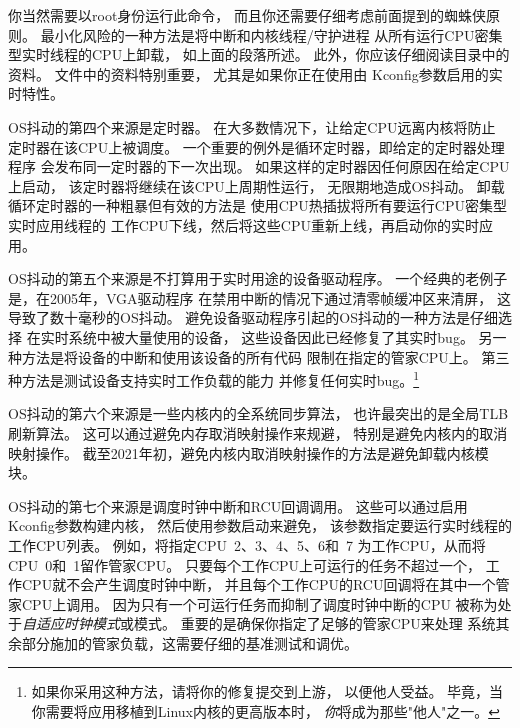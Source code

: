
你当然需要以root身份运行此命令，
而且你还需要仔细考虑前面提到的蜘蛛侠原则。
最小化风险的一种方法是将中断和内核线程/守护进程
从所有运行CPU密集型实时线程的CPU上卸载，
如上面的段落所述。
此外，你应该仔细阅读目录中的资料。
文件中的资料特别重要，
尤其是如果你正在使用由
Kconfig参数启用的实时特性。

OS抖动的第四个来源是定时器。
在大多数情况下，让给定CPU远离内核将防止
定时器在该CPU上被调度。\@
一个重要的例外是循环定时器，即给定的定时器处理程序
会发布同一定时器的下一次出现。
如果这样的定时器因任何原因在给定CPU上启动，
该定时器将继续在该CPU上周期性运行，
无限期地造成OS抖动。
卸载循环定时器的一种粗暴但有效的方法是
使用CPU热插拔将所有要运行CPU密集型实时应用线程的
工作CPU下线，然后将这些CPU重新上线，再启动你的实时应用。

OS抖动的第五个来源是不打算用于实时用途的设备驱动程序。
一个经典的老例子是，在2005年，VGA驱动程序
在禁用中断的情况下通过清零帧缓冲区来清屏，
这导致了数十毫秒的OS抖动。
避免设备驱动程序引起的OS抖动的一种方法是仔细选择
在实时系统中被大量使用的设备，
这些设备因此已经修复了其实时bug。
另一种方法是将设备的中断和使用该设备的所有代码
限制在指定的管家CPU上。
第三种方法是测试设备支持实时工作负载的能力
并修复任何实时bug。\footnote{
	如果你采用这种方法，请将你的修复提交到上游，
	以便他人受益。
	毕竟，当你需要将应用移植到Linux内核的更高版本时，
	\emph{你}将成为那些"他人"之一。}

OS抖动的第六个来源是一些内核内的全系统同步算法，
也许最突出的是全局TLB刷新算法。
这可以通过避免内存取消映射操作来规避，
特别是避免内核内的取消映射操作。
截至2021年初，避免内核内取消映射操作的方法是避免卸载内核模块。

OS抖动的第七个来源是调度时钟中断和RCU回调调用。
这些可以通过启用 Kconfig参数构建内核，
然后使用参数启动来避免，
该参数指定要运行实时线程的工作CPU列表。
例如，将指定CPU~2、3、4、5、6和~7
为工作CPU，从而将CPU~0和~1留作管家CPU。
只要每个工作CPU上可运行的任务不超过一个，
工作CPU就不会产生调度时钟中断，
并且每个工作CPU的RCU回调将在其中一个管家CPU上调用。
因为只有一个可运行任务而抑制了调度时钟中断的CPU
被称为处于\emph{自适应时钟模式}或模式。
重要的是确保你指定了足够的管家CPU来处理
系统其余部分施加的管家负载，这需要仔细的基准测试和调优。

